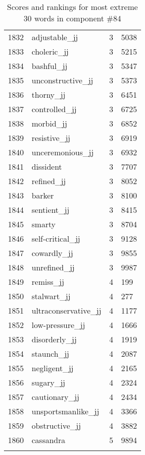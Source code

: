 \begin{longtable}[!htbp]{| rlr@{.}l |}
    1832 & adjustable\_jj & 3 & 5038 \\
    1833 & choleric\_jj & 3 & 5215 \\
    1834 & bashful\_jj & 3 & 5347 \\
    1835 & unconstructive\_jj & 3 & 5373 \\
    1836 & thorny\_jj & 3 & 6451 \\
    1837 & controlled\_jj & 3 & 6725 \\
    1838 & morbid\_jj & 3 & 6852 \\
    1839 & resistive\_jj & 3 & 6919 \\
    1840 & unceremonious\_jj & 3 & 6932 \\
    1841 & dissident & 3 & 7707 \\
    1842 & refined\_jj & 3 & 8052 \\
    1843 & barker & 3 & 8100 \\
    1844 & sentient\_jj & 3 & 8415 \\
    1845 & smarty & 3 & 8704 \\
    1846 & self-critical\_jj & 3 & 9128 \\
    1847 & cowardly\_jj & 3 & 9855 \\
    1848 & unrefined\_jj & 3 & 9987 \\
    1849 & remiss\_jj & 4 & 199 \\
    1850 & stalwart\_jj & 4 & 277 \\
    1851 & ultraconservative\_jj & 4 & 1177 \\
    1852 & low-pressure\_jj & 4 & 1666 \\
    1853 & disorderly\_jj & 4 & 1919 \\
    1854 & staunch\_jj & 4 & 2087 \\
    1855 & negligent\_jj & 4 & 2165 \\
    1856 & sugary\_jj & 4 & 2324 \\
    1857 & cautionary\_jj & 4 & 2434 \\
    1858 & unsportsmanlike\_jj & 4 & 3366 \\
    1859 & obstructive\_jj & 4 & 3882 \\
    1860 & cassandra & 5 & 9894 \\
    \hline
    \caption{Scores and rankings for most extreme 30 words in component \#84} \\
\end{longtable}
